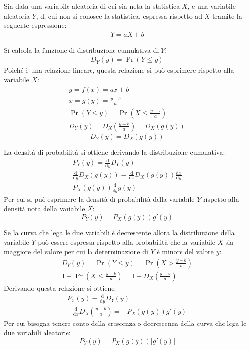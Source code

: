 \documentclass{article}
\newcommand{\df}{\mathrm{d}}
\numberwithin{equation}{subsection}
\begin{document}
Sia data una variabile aleatoria di cui sia nota la statistica $X$, e una variabile aleatoria $Y$, di cui non si conosce la statistica, espressa rispetto ad $X$ tramite la 
seguente espressione:
\begin{gather*}
    Y=aX+b
\end{gather*}

Si calcola la funzione di distribuzione cumulativa di $Y$:
\begin{gather*}
    D_Y(y)=\Pr(Y\leq y)
\end{gather*}
Poiché è una relazione lineare, questa relazione si può esprimere rispetto alla variabile $X$:
\begin{gather*}
    y=f(x)=ax+b\\
    x=g(y)=\displaystyle\frac{y-b}{a}\\
    \Pr(Y\leq y)=\Pr\left(X\leq\displaystyle\frac{y-b}{a}\right)\\
    D_Y(y)=D_X\left(\displaystyle\frac{y-b}{a}\right)=D_X(g(y))
\end{gather*}
\begin{equation}
    D_Y(y)=D_X(g(y))
\end{equation}

La densità di probabilità si ottiene derivando la distribuzione cumulativa:
\begin{gather*}
    P_Y(y)=\displaystyle\frac{\df}{\df y}D_Y(y)\\
    \frac{\df}{\df y}D_X(g(y))=\frac{\df}{\df x}D_X(g(y))\frac{\df x}{\df y}\\ %
    P_X(g(y))\frac{\df}{\df y}g(y)
\end{gather*}
Per cui si può esprimere la densità di probabilità della variabile $Y$ rispetto alla densità nota della variabile $X$:
\begin{equation*}
    P_Y(y)=P_X(g(y))g'(y)
\end{equation*}

Se la curva che lega le due variabili è decrescente allora la distribuzione della variabile $Y$ può essere espressa rispetto alla probabilità che la variabile $X$ sia 
maggiore del valore per cui la determinazione di $Y$ è minore del valore $y$: 
\begin{gather*}
    D_Y(y)=\Pr(Y\leq y)=\Pr\left(\displaystyle X>\frac{y-b}{a}\right)\\
    1-\Pr\left(X\leq\frac{y-b}{a}\right)=1-D_X\left(\frac{y-b}{a}\right)
\end{gather*}
Derivando questa relazione si ottiene:
\begin{gather*}
    P_Y(y)=\displaystyle\frac{\df}{\df y}D_Y(y)\\
    -\displaystyle\frac{\df}{\df x}D_X\left(\frac{y-b}{a}\right)=-P_X(g(y))g'(y)
\end{gather*}
Per cui bisogna tenere conto della crescenza o decrescenza della curva che lega le due variabili aleatorie:
\begin{equation}
    P_Y(y)=P_X(g(y))\left|g'(y)\right|
\end{equation}
\end{document}
